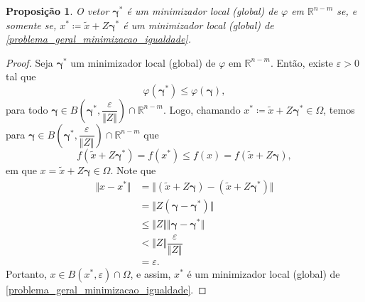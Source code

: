 \documentclass[12pt,a4paper]{scrartcl}
\def\RR{\mathds{R}}
\newtheorem{prop}{Proposição}
\theoremstyle{definition}%
\begin{document}
\begin{prop} \label{prop:equivalencia_problema_restricoes_igualdade_irrestrito}
O vetor $\boldsymbol{\gamma}^{*}$ é um minimizador local (global) de $\varphi$ em $\RR^{n-m}$ se, e somente se, $x^{*} \coloneqq  \tilde{x} + Z\boldsymbol{\gamma}^{*}$ é um minimizador local (global) de \eqref{problema_geral_minimizacao_igualdade}.
\end{prop}
\begin{proof}
Seja $\boldsymbol{\gamma}^{*}$ um minimizador local (global) de $\varphi$ em $\RR^{n-m}$. Então, existe $\varepsilon >0$ tal que
\[
\varphi (\boldsymbol{\gamma}^{*}) \leq \varphi (\boldsymbol{\gamma}) ,
\]
para todo $\boldsymbol{\gamma} \in B\left( \boldsymbol{\gamma}^{*} , \dfrac{\varepsilon}{\Vert Z \Vert} \right) \cap \RR^{n-m}$. Logo, chamando $x^{*}\coloneqq \tilde{x} + Z\boldsymbol{\gamma}^{*} \in \Omega$, temos para $\boldsymbol{\gamma} \in B\left( \boldsymbol{\gamma}^{*} , \dfrac{\varepsilon}{\Vert Z \Vert} \right) \cap \RR^{n-m}$ que
\[
f(\tilde{x} + Z\boldsymbol{\gamma}^{*} ) = f(x^{*}) \leq f(x) = f(\tilde{x} + Z\boldsymbol{\gamma}) ,
\]
em que $x = \tilde{x} + Z\boldsymbol{\gamma} \in \Omega$. Note que
\[
\begin{aligned}
\Vert x-x^{*} \Vert &= \Vert (\tilde{x} + Z\boldsymbol{\gamma}) - (\tilde{x} + Z\boldsymbol{\gamma}^{*}) \Vert \\
&= \Vert Z(\boldsymbol{\gamma} - \boldsymbol{\gamma}^{*} )\Vert \\
&\leq \Vert Z\Vert \Vert \boldsymbol{\gamma} - \boldsymbol{\gamma}^{*} \Vert \\
&< \Vert Z\Vert \dfrac{\varepsilon}{\Vert Z \Vert} \\
&= \varepsilon . 
\end{aligned}
\]
Portanto, $x\in B(x^{*}, \varepsilon ) \cap \Omega$, e assim,  $x^{*}$ é um minimizador local (global) de \eqref{problema_geral_minimizacao_igualdade}.


\end{proof}
\end{document}
